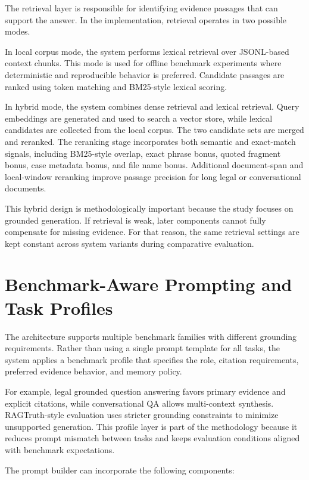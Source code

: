 The retrieval layer is responsible for identifying evidence passages that can support the answer. In the implementation, retrieval operates in two possible modes.

In local corpus mode, the system performs lexical retrieval over JSONL-based context chunks. This mode is used for offline benchmark experiments where deterministic and reproducible behavior is preferred. Candidate passages are ranked using token matching and BM25-style lexical scoring.

In hybrid mode, the system combines dense retrieval and lexical retrieval. Query embeddings are generated and used to search a vector store, while lexical candidates are collected from the local corpus. The two candidate sets are merged and reranked. The reranking stage incorporates both semantic and exact-match signals, including BM25-style overlap, exact phrase bonus, quoted fragment bonus, case metadata bonus, and file name bonus. Additional document-span and local-window reranking improve passage precision for long legal or conversational documents.

This hybrid design is methodologically important because the study focuses on grounded generation. If retrieval is weak, later components cannot fully compensate for missing evidence. For that reason, the same retrieval settings are kept constant across system variants during comparative evaluation.

\section{Benchmark-Aware Prompting and Task Profiles}
\label{sec:methodology-prompting}

The architecture supports multiple benchmark families with different grounding requirements. Rather than using a single prompt template for all tasks, the system applies a benchmark profile that specifies the role, citation requirements, preferred evidence behavior, and memory policy.

For example, legal grounded question answering favors primary evidence and explicit citations, while conversational QA allows multi-context synthesis. RAGTruth-style evaluation uses stricter grounding constraints to minimize unsupported generation. This profile layer is part of the methodology because it reduces prompt mismatch between tasks and keeps evaluation conditions aligned with benchmark expectations.

The prompt builder can incorporate the following components:

